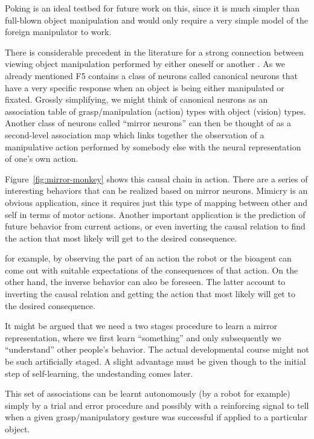 \ifverbose
Poking is an ideal testbed for future work on this, since it is much
simpler than full-blown object manipulation and would only require a
very simple model of the foreign manipulator to work.

There is considerable precedent in the literature for a strong
connection between viewing object manipulation performed by either
oneself or another \cite{wohlsclager02human}.  As we already mentioned
F5 contains a class of neurons called canonical neurons that have a
very specific response when an object is being either manipulated or
fixated.  Grossly simplifying, we might think of canonical neurons as
an association table of grasp/manipulation (action) types with object
(vision) types.  Another class of neurons called ``mirror neurons''
can then be thought of as a second-level association map which links
together the observation of a manipulative action performed by
somebody else with the neural representation of one's own action.

Figure~\ref{fig:mirror-monkey} shows this causal chain in action.
There are a series of interesting behaviors that can be realized based
on mirror neurons. Mimicry is an obvious application, since it
requires just this type of mapping between other and self in terms of
motor actions.  Another important application is the prediction of
future behavior from current actions, or even inverting the causal
relation to find the action that most likely will get to the desired
consequence.
\fi

\ifverbose

for example, by observing the part of an action the robot or the
bioagent can come out with suitable expectations of the consequences
of that action. On the other hand, the inverse behavior can also be
foreseen. The latter account to inverting the causal relation and
getting the action that most likely will get to the desired
consequence.

It might be argued that we need a two stages procedure to learn a
mirror representation, where we first learn ``something'' and only
subsequently we ``understand'' other people's behavior. The actual
developmental course might not be such artificially staged. A slight
advantage must be given though to the initial step of self-learning,
the undestanding comes later.


This set of associations can be learnt autonomously (by a robot for
example) simply by a trial and error procedure and possibly with a
reinforcing signal to tell when a given grasp/manipulatory gesture was
successful if applied to a particular object.

